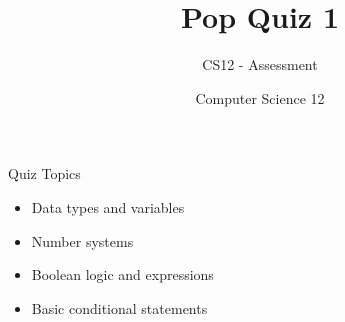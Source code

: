 \documentclass[10pt]{beamer}
\title{Pop Quiz 1}
\subtitle{CS12 - Assessment}
\author{Computer Science 12}
\date{}
\begin{document}
\begin{frame}
    \titlepage
\end{frame}

\begin{frame}{Quiz Topics}
    \begin{itemize}
        \item Data types and variables
        \item Number systems
        \item Boolean logic and expressions
        \item Basic conditional statements
    \end{itemize}
\end{frame}

\end{document}
